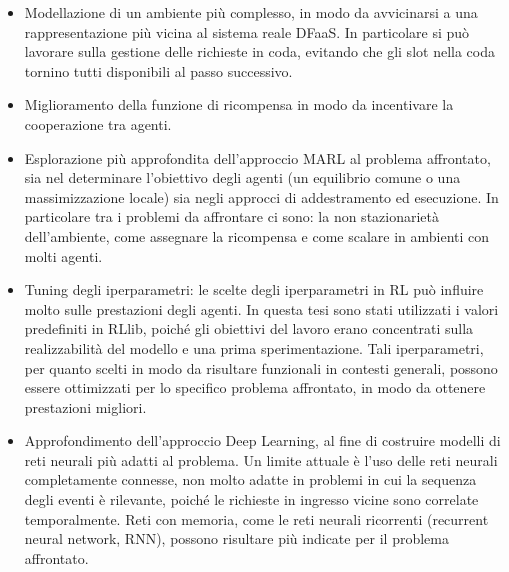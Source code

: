 \begin{itemize}
    \item Modellazione di un ambiente più complesso, in modo da avvicinarsi a una rappresentazione più vicina al sistema reale DFaaS. In particolare  si può lavorare sulla gestione delle richieste in coda, evitando che gli slot nella coda tornino tutti disponibili al passo successivo.

    \item Miglioramento della funzione di ricompensa in modo da incentivare la cooperazione tra agenti.

    \item Esplorazione più approfondita dell'approccio MARL al problema affrontato, sia nel determinare l'obiettivo degli agenti (un equilibrio comune o una massimizzazione locale) sia negli approcci di addestramento ed esecuzione. In particolare tra i problemi da affrontare ci sono: la non stazionarietà dell'ambiente, come assegnare la ricompensa e come scalare in ambienti con molti agenti.
    
    \item Tuning degli iperparametri: le scelte degli iperparametri in RL può influire molto sulle prestazioni degli agenti. In questa tesi sono stati utilizzati i valori predefiniti in RLlib, poiché gli obiettivi del lavoro erano concentrati sulla realizzabilità del modello e una prima sperimentazione. Tali iperparametri, per quanto scelti in modo da risultare funzionali in contesti generali, possono essere ottimizzati per lo specifico problema affrontato, in modo da ottenere prestazioni migliori.

    \item Approfondimento dell'approccio Deep Learning, al fine di costruire modelli di reti neurali più adatti al problema. Un limite attuale è l'uso delle reti neurali completamente connesse, non molto adatte in problemi in cui la sequenza degli eventi è rilevante, poiché le richieste in ingresso vicine sono correlate temporalmente. Reti con memoria, come le reti neurali ricorrenti (recurrent neural network, RNN), possono risultare più indicate per il problema affrontato.
\end{itemize}